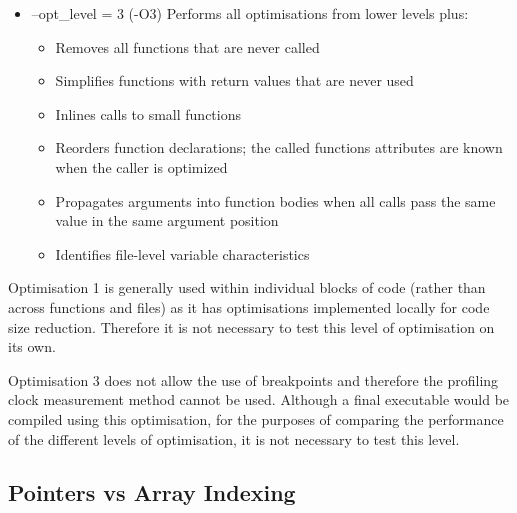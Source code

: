 \begin{itemize}
    \item --opt\_level = 3 (-O3)
    Performs all optimisations from lower levels plus:
    \begin{itemize}
        \item Removes all functions that are never called
        \item Simplifies functions with return values that are never used
        \item Inlines calls to small functions
        \item Reorders function declarations; the called functions attributes are known when the caller is
optimized

        \item Propagates arguments into function bodies when all calls pass the same value in the same
argument position
        \item Identifies file-level variable characteristics
    \end{itemize}
\end{itemize}

Optimisation 1 is generally used within individual blocks of code (rather than across functions and files) as it has optimisations implemented locally for code size reduction. Therefore it is not necessary to test this level of optimisation on its own.

Optimisation 3 does not allow the use of breakpoints and therefore the profiling clock measurement method cannot be used. Although a final executable would be compiled using this optimisation, for the purposes of comparing the performance of the different levels of optimisation, it is not necessary to test this level.

\subsection{Pointers vs Array Indexing}


